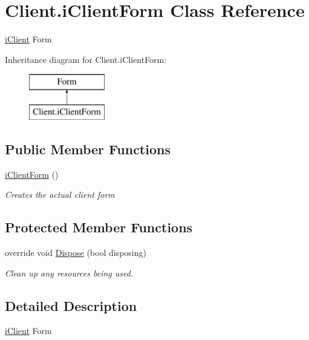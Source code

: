 \hypertarget{class_client_1_1i_client_form}{}\section{Client.\+i\+Client\+Form Class Reference}
\label{class_client_1_1i_client_form}


\mbox{\hyperlink{namespacei_client}{i\+Client}} Form  


Inheritance diagram for Client.\+i\+Client\+Form\+:\begin{figure}[H]
\begin{center}
\leavevmode
\includegraphics[height=2.000000cm]{class_client_1_1i_client_form}
\end{center}
\end{figure}
\subsection*{Public Member Functions}
\begin{DoxyCompactItemize}
\item 
\mbox{\hyperlink{class_client_1_1i_client_form_a02a4efefdc76771e7781b4b30e598465}{i\+Client\+Form}} ()
\begin{DoxyCompactList}\small\item\em Creates the actual client form \end{DoxyCompactList}\end{DoxyCompactItemize}
\subsection*{Protected Member Functions}
\begin{DoxyCompactItemize}
\item 
override void \mbox{\hyperlink{class_client_1_1i_client_form_a12dd32ccdf0e36d4e350fc51de41ce7b}{Dispose}} (bool disposing)
\begin{DoxyCompactList}\small\item\em Clean up any resources being used. \end{DoxyCompactList}\end{DoxyCompactItemize}


\subsection{Detailed Description}
\mbox{\hyperlink{namespacei_client}{i\+Client}} Form 



